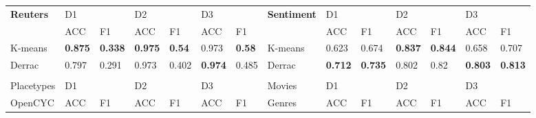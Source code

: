 {\begin{landscape}
	\begin{table}[]
		\footnotesize
		\begin{tabular}{llllllllllllll}
		\textbf{Reuters}     & D1                              &                                 & D2                              &                                 & D3                              &                                 & \textbf{Sentiment}                      & D1                              &                                 & D2                              &                                 & D3                              &                                             \\
& ACC                             & F1                              & ACC                             & F1                              & ACC                             & F1                              &                                & ACC                             & F1                              & ACC                             & F1                              & ACC                             & F1                                    \\
\toprule[\heavyrulewidth]
K-means     & \textbf{0.875} & \textbf{0.338} & \textbf{0.975} & \textbf{0.54}  & 0.973                           & \textbf{0.58}  & K-means                        & 0.623                           & 0.674                           & \textbf{0.837} & \textbf{0.844} & 0.658                           & 0.707                                   \\
\midrule
Derrac      & 0.797                           & 0.291                           & 0.973                           & 0.402                           & \textbf{0.974} & 0.485                           & Derrac                         & \textbf{0.712} & \textbf{0.735} & 0.802                           & 0.82                            & \textbf{0.803} & \textbf{0.813}            \\
&&&&&&\\
Placetypes  & D1                              &                                 & D2                              &                                 & D3                              &                                 & Movies                         & D1                              &                                 & D2                              &                                 & D3                              &                          \\
OpenCYC     & ACC                             & F1                              & ACC                             & F1                              & ACC                             & F1                              & Genres                         & ACC                             & F1                              & ACC                             & F1                              & ACC                             & F1                                         \\

\end{tabular}
\end{table}
\end{landscape}}
